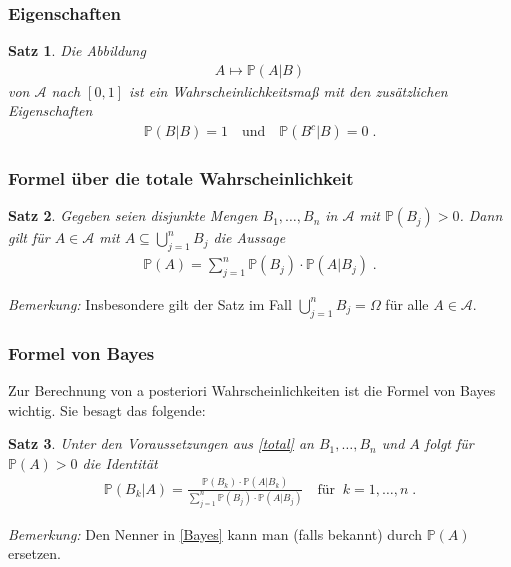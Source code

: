 \documentclass[ngerman,draft,parskip=half,twoside]{scrartcl}
\newtheorem{thm}{Satz}[section]
\newcommand*{\Algeb}{\mathcal{A}}   %
\newcommand*{\WKM}{\mathbb{P}}      %
\begin{document}
\subsubsection{Eigenschaften}

\begin{thm}
  Die Abbildung
  \begin{gather*}
    A\mapsto \WKM(A|B)
  \end{gather*}
  von $\Algeb$ nach $[0,1]$ ist ein Wahrscheinlichkeitsmaß mit den zusätzlichen
  Eigenschaften
  \begin{gather*}
    \WKM(B|B)=1\quad\mbox{und}\quad\WKM(B^c|B)=0\;.
  \end{gather*}
\end{thm}

\subsubsection{Formel über die totale Wahrscheinlichkeit}

\begin{thm}
  \label{total}
  Gegeben seien disjunkte Mengen $B_1,\dotsc,B_n$ in $\Algeb$ mit
  $\WKM(B_j)>0$. Dann gilt für $A\in \Algeb$ mit $A\subseteq\bigcup_{j=1}^n
  B_j$ die Aussage
  \begin{gather*}
    \WKM(A)=\sum_{j=1}^n\WKM(B_j)\cdot\WKM(A|B_j)\;.
  \end{gather*}
\end{thm}

\textit{Bemerkung:}
Insbesondere gilt der Satz im Fall $\bigcup_{j=1}^n B_j=\Omega$ für alle
$A\in\Algeb$.

\subsubsection{Formel von Bayes}
Zur Berechnung von a posteriori Wahrscheinlichkeiten ist die Formel von Bayes
wichtig. Sie besagt das folgende:
\begin{thm}
  Unter den Voraussetzungen aus \autoref{total} an $B_1,\dotsc,B_n$ und $A$
  folgt für $\WKM(A)>0$ die Identität
  \begin{gather}
    \label{Bayes}
    \WKM(B_k|A)=\frac{\WKM(B_k)\cdot\WKM(A|B_k)}{\sum_{j=1}^n
       \WKM(B_j)\cdot\WKM(A|B_j)}\quad\mbox{für}\;\;k=1,\dotsc,n\;.
  \end{gather}
\end{thm}

\textit{Bemerkung:}
Den Nenner in \autoref{Bayes} kann man (falls bekannt) durch $\WKM(A)$
ersetzen.
\end{document}
